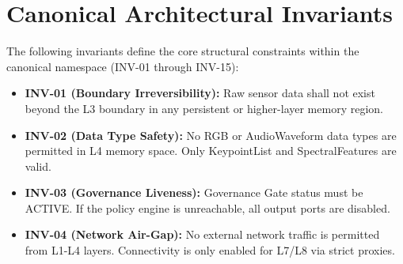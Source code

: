 \documentclass[conference]{IEEEtran}
\begin{document}
\section{Canonical Architectural Invariants}
The following invariants define the core structural constraints within the canonical namespace (INV-01 through INV-15):
\begin{itemize}
    \item \textbf{INV-01 (Boundary Irreversibility):} Raw sensor data shall not exist beyond the L3 boundary in any persistent or higher-layer memory region.
    \item \textbf{INV-02 (Data Type Safety):} No RGB or AudioWaveform data types are permitted in L4 memory space. Only KeypointList and SpectralFeatures are valid.
    \item \textbf{INV-03 (Governance Liveness):} Governance Gate status must be ACTIVE. If the policy engine is unreachable, all output ports are disabled.
    \item \textbf{INV-04 (Network Air-Gap):} No external network traffic is permitted from L1-L4 layers. Connectivity is only enabled for L7/L8 via strict proxies.
\end{itemize}
\end{document}
